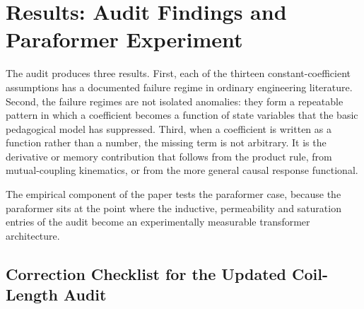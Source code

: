 
\section{Results: Audit Findings and Paraformer Experiment}
\label{sec:results-audit-paraformer}

The audit produces three results. First, each of the thirteen
constant-coefficient assumptions has a documented failure regime in ordinary
engineering literature. Second, the failure regimes are not isolated anomalies:
they form a repeatable pattern in which a coefficient becomes a function of
state variables that the basic pedagogical model has suppressed. Third, when a
coefficient is written as a function rather than a number, the missing term is
not arbitrary. It is the derivative or memory contribution that follows from
the product rule, from mutual-coupling kinematics, or from the more general
causal response functional.

The empirical component of the paper tests the paraformer case, because the
paraformer sits at the point where the inductive, permeability and saturation
entries of the audit become an experimentally measurable transformer
architecture.

\subsection{Correction Checklist for the Updated Coil-Length Audit}
\label{subsec:updated-correction-checklist}

